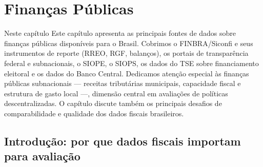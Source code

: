 
\chapter{Finanças Públicas}

\begin{boxdestaque}{Neste capítulo}
Este capítulo apresenta as principais fontes de dados sobre finanças públicas disponíveis para o Brasil. Cobrimos o FINBRA/Siconfi e seus instrumentos de reporte (RREO, RGF, balanços), os portais de transparência federal e subnacionais, o SIOPE, o SIOPS, os dados do TSE sobre financiamento eleitoral e os dados do Banco Central. Dedicamos atenção especial às finanças públicas subnacionais --- receitas tributárias municipais, capacidade fiscal e estrutura de gasto local ---, dimensão central em avaliações de políticas descentralizadas. O capítulo discute também os principais desafios de comparabilidade e qualidade dos dados fiscais brasileiros.
\end{boxdestaque}

\section{Introdução: por que dados fiscais importam para avaliação}

